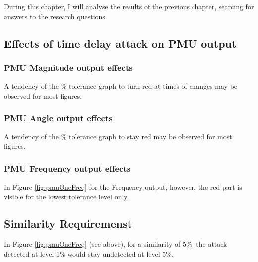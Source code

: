 During this chapter, I will analyse the results of the previous chapter, searcing for answers to the research questions.

\subsection{Effects of time delay attack on PMU output}

\subsubsection{PMU Magnitude output effects}
A tendency of the \% tolerance graph to turn red at times of changes may be observed for most figures.

\subsubsection{PMU Angle output effects}

A tendency of the \% tolerance graph to stay red may be observed for most figures.


\subsubsection{PMU Frequency output effects}
In Figure \ref{fig:pmuOneFreq} for the Frequency output, however, the red part is visible for the lowest tolerance level only.
\subsection{Similarity Requiremenst}
In Figure \ref{fig:pmuOneFreq} (see above), for a similarity of 5\%, the attack detected  at level 1\% would stay undetected at level 5\%. 